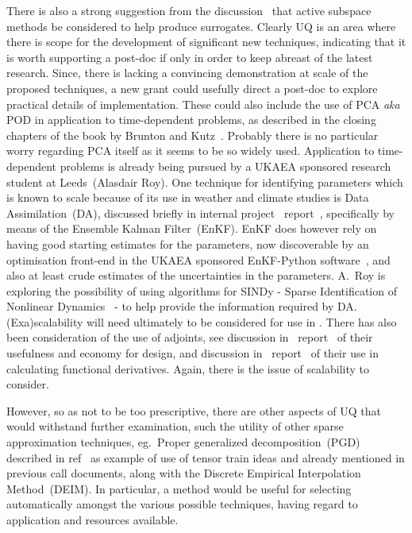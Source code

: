 There is also a strong suggestion from the discussion~\cite{y2re241} that active subspace methods be considered
to help produce surrogates.
Clearly UQ is an area where there is scope for the development of significant new techniques,
indicating that it is worth supporting a post-doc if only in order to keep abreast of the latest research.
Since, there is lacking a convincing demonstration at scale of the proposed techniques, a new grant
could usefully direct a post-doc to explore practical details of implementation.
These could also include the use of PCA \emph{aka} POD in application to time-dependent problems, as
described in the closing chapters of the book by Brunton and Kutz~\cite[\S\,11,12]{bruntonkutz}.
Probably there is no particular worry regarding PCA itself as it seems to be so widely used.
Application to time-dependent problems is already being pursued by a UKAEA sponsored research
student at Leeds~(Alasdair Roy).
One technique for identifying parameters which is known to scale because of its use in
weather and climate studies is Data Assimilation~(DA), discussed briefly in internal
project \nep \ report~\cite[\S\,3]{y2re251}, specifically by means of the Ensemble Kalman Filter~(EnKF).
EnKF does however rely on having good starting estimates for the parameters, now discoverable
by an optimisation front-end in the UKAEA sponsored EnKF-Python software~\cite{Ar18Data},
and also at least crude estimates of the  uncertainties in the parameters. A.~Roy is exploring
the possibility of using algorithms for SINDy - Sparse Identification of Nonlinear
Dynamics~\cite[\S\,7.3]{bruntonkutz} - to help provide the information required by DA.
(Exa)scalability will need ultimately to be considered for use in \nep.
There has also been consideration of the use of adjoints, see
discussion in \nep \ report~\cite[\S\,2.4.1]{y1re121} of their usefulness and economy for design, and
discussion in \nep \ report~\cite[\S\,3.2]{y2re251} of their use in calculating functional
derivatives. Again, there is the issue of scalability to consider.


However, so as not to be too prescriptive, there are other aspects of UQ that would withstand further examination,
such the utility of other sparse approximation techniques, eg.\ Proper generalized decomposition~(PGD)
described in ref~\cite{chinestaetal} as example of use of tensor train ideas
and already mentioned in previous call documents, along with the Discrete Empirical Interpolation Method~(DEIM). 
In particular, a method would be useful for selecting automatically amongst the various possible techniques, having
regard to application and resources available.
